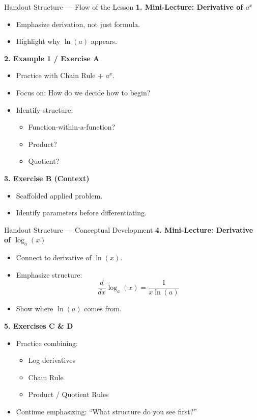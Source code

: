 \documentclass{beamer}
\begin{document}
\begin{frame}{Handout Structure — Flow of the Lesson}
\textbf{1. Mini-Lecture: Derivative of $a^x$}
\begin{itemize}
    \item Emphasize derivation, not just formula.
    \item Highlight why $\ln(a)$ appears.
\end{itemize}

\bigskip

\textbf{2. Example 1 / Exercise A}
\begin{itemize}
    \item Practice with Chain Rule + $a^x$.
    \item Focus on: How do we decide how to begin?
    \item Identify structure:
    \begin{itemize}
        \item Function-within-a-function?
        \item Product?
        \item Quotient?
    \end{itemize}
\end{itemize}

\bigskip

\textbf{3. Exercise B (Context)}
\begin{itemize}
    \item Scaffolded applied problem.
    \item Identify parameters before differentiating.
\end{itemize}
\end{frame}

\begin{frame}{Handout Structure — Conceptual Development}
\textbf{4. Mini-Lecture: Derivative of $\log_a(x)$}
\begin{itemize}
    \item Connect to derivative of $\ln(x)$.
    \item Emphasize structure:
    \[
    \frac{d}{dx}\log_a(x) = \frac{1}{x\ln(a)}
    \]
    \item Show where $\ln(a)$ comes from.
\end{itemize}

\bigskip

\textbf{5. Exercises C \& D}
\begin{itemize}
    \item Practice combining:
    \begin{itemize}
        \item Log derivatives
        \item Chain Rule
        \item Product / Quotient Rules
    \end{itemize}
    \item Continue emphasizing: “What structure do you see first?”
\end{itemize}
\end{frame}
\end{document}
